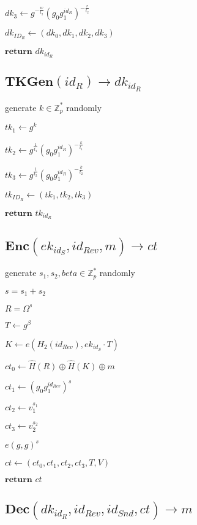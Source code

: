 \documentclass[a4paper]{article}
\begin{document}
$\textit{dk}_3 \gets g^{-\frac{w}{t_2}}(g_0 g_1^{\textit{id}_R})^{-\frac{r}{t_2}}$

$\textit{dk}_{\textit{ID}_R} \gets (\textit{dk}_0, \textit{dk}_1, \textit{dk}_2, \textit{dk}_3)$

$\textbf{return }\textit{dk}_{\textit{id}_R}$

\subsection{$\textbf{TKGen}(\textit{id}_R) \rightarrow \textit{dk}_{\textit{id}_R}$}

generate $k \in \mathbb{Z}_p^*$ randomly

$\textit{tk}_1 \gets g^k$

$\textit{tk}_2 \gets g^{\frac{1}{t_1}}(g_0 g_1^{\textit{id}_R})^{-\frac{k}{t_1}}$

$\textit{tk}_3 \gets g^{\frac{1}{t_2}}(g_0 g_1^{\textit{id}_R})^{-\frac{k}{t_2}}$

$\textit{tk}_{\textit{ID}_R} \gets (\textit{tk}_1, \textit{tk}_2, \textit{tk}_3)$

$\textbf{return }\textit{tk}_{\textit{id}_R}$

\subsection{$\textbf{Enc}(\textit{ek}_{\textit{id}_S}, \textit{id}_\textit{Rev}, m) \rightarrow \textit{ct}$}

generate $s_1, s_2, beta \in \mathbb{Z}_p^*$ randomly

$s = s_1 + s_2$

$R = \Omega^s$

$T \gets g^\beta$

$K \gets e(H_2(\textit{id}_\textit{Rev}), \textit{ek}_{\textit{id}_S} \cdot T)$

$\textit{ct}_0 \gets \hat{H}(R) \oplus \hat{H}(K) \oplus m$

$\textit{ct}_1 \gets (g_0 g_1^{\textit{id}_\textit{Rev}})^s$

$\textit{ct}_2 \gets v_1^{s_1}$

$\textit{ct}_3 \gets v_2^{s_2}$

$e(g, g)^s$

$\textit{ct} \gets (\textit{ct}_0, \textit{ct}_1, \textit{ct}_2, \textit{ct}_3, T, V)$

$\textbf{return }\textit{ct}$

\subsection{$\textbf{Dec}(\textit{dk}_{\textit{id}_R}, \textit{id}_\textit{Rev}, \textit{id}_\textit{Snd}, \textit{ct}) \rightarrow m$}
\end{document}
